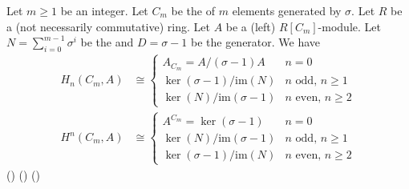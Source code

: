 \begin{proposition} \label{proposition:group_homology_cohomology_for_module_of_finite_cyclic_group.tex}
    Let $m \geq 1$ be an integer. Let $C_m$ be the  of $m$ elements generated by $\sigma$. Let $R$ be a (not necessarily commutative) ring. Let $A$ be a (left) $R[C_m]$-module. Let $N = \sum_{i=0}^{m-1} \sigma^i$ be the  and $D = \sigma - 1$ be the  generator. We have
    \begin{align*}
        H_n(C_m, A) &\cong \begin{cases} 
            A_{C_m} = A/(\sigma-1)A & n = 0 \\
            \ker(\sigma-1)/\text{im}(N) & n \text{ odd, } n \geq 1 \\
            \ker(N)/\text{im}(\sigma-1) & n \text{ even, } n \geq 2 
        \end{cases} \\
        H^n(C_m, A) &\cong \begin{cases} 
            A^{C_m} = \ker(\sigma-1) & n = 0 \\
            \ker(N)/\text{im}(\sigma-1) & n \text{ odd, } n \geq 1 \\
            \ker(\sigma-1)/\text{im}(N) & n \text{ even, } n \geq 2 
        \end{cases}
    \end{align*}
    () () ()
\end{proposition}
